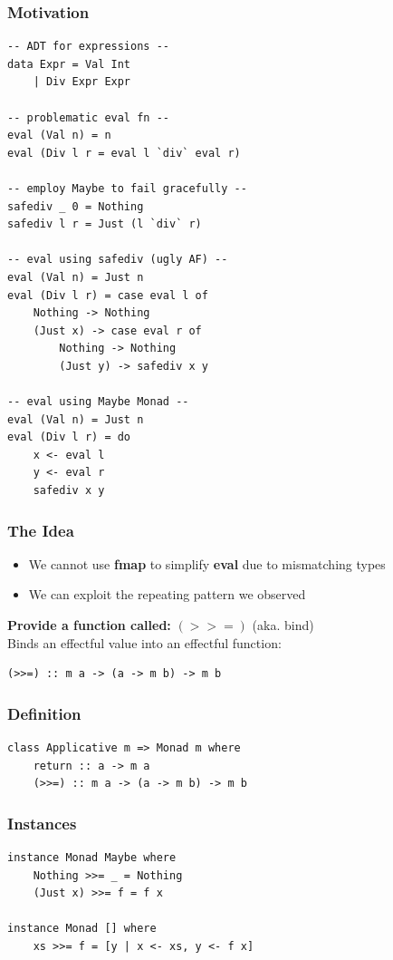 \subsubsection{Motivation}
\begin{lstlisting}
-- ADT for expressions --
data Expr = Val Int
    | Div Expr Expr

-- problematic eval fn --
eval (Val n) = n
eval (Div l r = eval l `div` eval r)

-- employ Maybe to fail gracefully --
safediv _ 0 = Nothing 
safediv l r = Just (l `div` r)

-- eval using safediv (ugly AF) -- 
eval (Val n) = Just n
eval (Div l r) = case eval l of
    Nothing -> Nothing 
    (Just x) -> case eval r of
        Nothing -> Nothing 
        (Just y) -> safediv x y

-- eval using Maybe Monad --
eval (Val n) = Just n
eval (Div l r) = do
    x <- eval l
    y <- eval r
    safediv x y
\end{lstlisting}

\subsubsection{The Idea}
\begin{itemize}
    \item We cannot use \textbf{fmap} to simplify \textbf{eval} due to mismatching types
    \item We can exploit the repeating pattern we observed
\end{itemize}
\textbf{Provide a function called:} $(>>=)$ (aka. bind)\\
Binds an effectful value into an effectful function:
\begin{lstlisting}
(>>=) :: m a -> (a -> m b) -> m b
\end{lstlisting}

\subsubsection{Definition}
\begin{lstlisting}
class Applicative m => Monad m where
    return :: a -> m a
    (>>=) :: m a -> (a -> m b) -> m b
\end{lstlisting}


\subsubsection{Instances}
\begin{lstlisting}
instance Monad Maybe where
    Nothing >>= _ = Nothing 
    (Just x) >>= f = f x

instance Monad [] where
    xs >>= f = [y | x <- xs, y <- f x]
\end{lstlisting}

